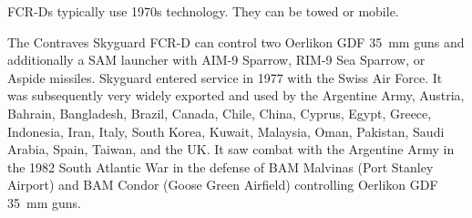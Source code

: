 FCR-Ds typically use 1970s technology. They can be towed or mobile.


The Contraves Skyguard FCR-D can control two Oerlikon GDF 35~mm guns and additionally a SAM launcher with AIM-9 Sparrow, RIM-9 Sea Sparrow, or Aspide missiles.
Skyguard entered service in 1977 with the Swiss Air Force.
It was subsequently very widely exported and used by the Argentine Army, Austria, Bahrain, Bangladesh, Brazil, Canada, Chile, China, Cyprus, Egypt, Greece, Indonesia, Iran, Italy, South Korea, Kuwait, Malaysia, Oman, Pakistan, Saudi Arabia, Spain, Taiwan, and the UK.
It saw combat with the Argentine Army in the 1982 South Atlantic War in the defense of BAM Malvinas (Port Stanley Airport) and BAM Condor (Goose Green Airfield) controlling Oerlikon GDF 35~mm guns.%

\begin{table}
    \caption*{\hypertarget{table:fcr-units}{FCR Unit Table}}
    \centering
    \footnotesize
    
    \label{table:fcr-units}
\end{table}
